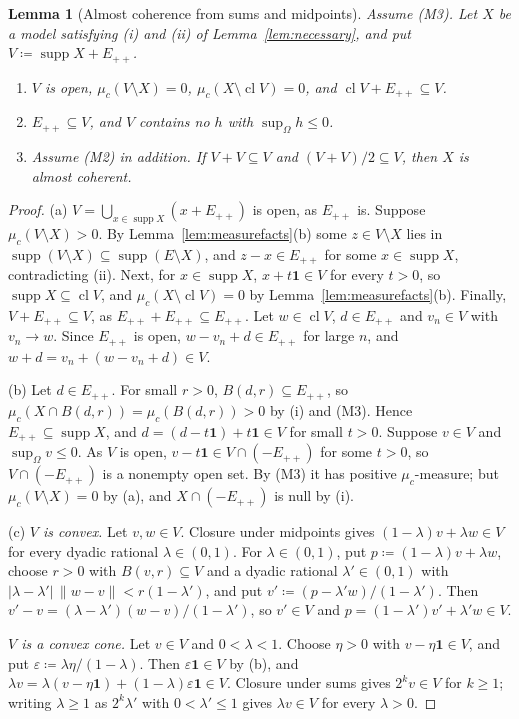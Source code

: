 \documentclass[11pt]{article}
\newtheorem{lemma}[theorem]{Lemma}
\theoremstyle{definition}
\newcommand{\one}{\mathbf 1}
\newcommand{\Epp}{E_{++}}
\DeclareMathOperator{\supp}{supp}
\DeclareMathOperator{\cl}{cl}
\begin{document}
\begin{lemma}[Almost coherence from sums and midpoints]\label{lem:identify}
Assume (M3). Let $X$ be a model satisfying (i) and (ii) of Lemma~\ref{lem:necessary}, and put $V\coloneqq\supp X+\Epp$.
\begin{enumerate}[label=(\alph*)]
\item $V$ is open, $\mu_c(V\setminus X)=0$, $\mu_c(X\setminus\cl V)=0$, and $\cl V+\Epp\subseteq V$.
\item $\Epp\subseteq V$, and $V$ contains no $h$ with $\sup_\Omega h\le0$.
\item Assume (M2) in addition. If $V+V\subseteq V$ and $(V+V)/2\subseteq V$, then $X$ is almost coherent.
\end{enumerate}
\end{lemma}
\begin{proof}
(a) $V=\bigcup_{x\in\supp X}(x+\Epp)$ is open, as $\Epp$ is. Suppose $\mu_c(V\setminus X)>0$. By Lemma~\ref{lem:measurefacts}(b) some $z\in V\setminus X$ lies in $\supp(V\setminus X)\subseteq\supp(E\setminus X)$, and $z-x\in\Epp$ for some $x\in\supp X$, contradicting (ii). Next, for $x\in\supp X$, $x+t\one\in V$ for every $t>0$, so $\supp X\subseteq\cl V$, and $\mu_c(X\setminus\cl V)=0$ by Lemma~\ref{lem:measurefacts}(b). Finally, $V+\Epp\subseteq V$, as $\Epp+\Epp\subseteq\Epp$. Let $w\in\cl V$, $d\in\Epp$ and $v_n\in V$ with $v_n\to w$. Since $\Epp$ is open, $w-v_n+d\in\Epp$ for large $n$, and $w+d=v_n+(w-v_n+d)\in V$.

(b) Let $d\in\Epp$. For small $r>0$, $B(d,r)\subseteq\Epp$, so $\mu_c(X\cap B(d,r))=\mu_c(B(d,r))>0$ by (i) and (M3). Hence $\Epp\subseteq\supp X$, and $d=(d-t\one)+t\one\in V$ for small $t>0$. Suppose $v\in V$ and $\sup_\Omega v\le0$. As $V$ is open, $v-t\one\in V\cap(-\Epp)$ for some $t>0$, so $V\cap(-\Epp)$ is a nonempty open set. By (M3) it has positive $\mu_c$-measure; but $\mu_c(V\setminus X)=0$ by (a), and $X\cap(-\Epp)$ is null by (i).

(c) \emph{$V$ is convex.} Let $v,w\in V$. Closure under midpoints gives $(1-\lambda)v+\lambda w\in V$ for every dyadic rational $\lambda\in(0,1)$. For $\lambda\in(0,1)$, put $p\coloneqq(1-\lambda)v+\lambda w$, choose $r>0$ with $B(v,r)\subseteq V$ and a dyadic rational $\lambda'\in(0,1)$ with $|\lambda-\lambda'|\,\|w-v\|<r(1-\lambda')$, and put $v'\coloneqq(p-\lambda'w)/(1-\lambda')$. Then $v'-v=(\lambda-\lambda')(w-v)/(1-\lambda')$, so $v'\in V$ and $p=(1-\lambda')v'+\lambda'w\in V$.

\emph{$V$ is a convex cone.} Let $v\in V$ and $0<\lambda<1$. Choose $\eta>0$ with $v-\eta\one\in V$, and put $\varepsilon\coloneqq\lambda\eta/(1-\lambda)$. Then $\varepsilon\one\in V$ by (b), and $\lambda v=\lambda(v-\eta\one)+(1-\lambda)\varepsilon\one\in V$. Closure under sums gives $2^kv\in V$ for $k\ge1$; writing $\lambda\ge1$ as $2^k\lambda'$ with $0<\lambda'\le1$ gives $\lambda v\in V$ for every $\lambda>0$.


\end{proof}
\end{document}
